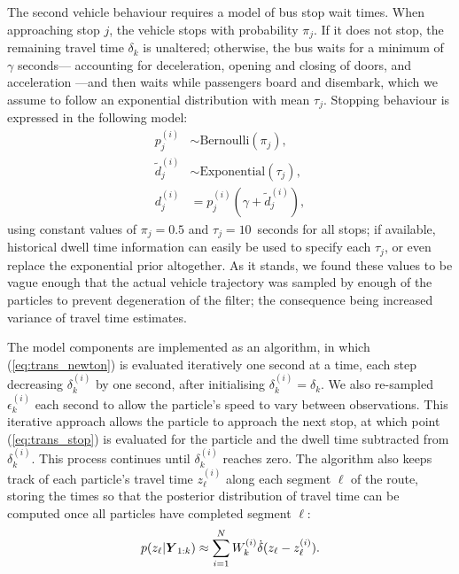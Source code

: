 \documentclass[times, doublespace]{anzsauth}
\begin{document}
The second vehicle behaviour requires a model of bus stop wait times.
When approaching stop $j$,
the vehicle stops with probability $\pi_j$.
If it does not stop, the remaining travel time $\delta_k$ is unaltered;
otherwise, the bus waits for a minimum of $\gamma$ seconds---%
accounting for deceleration, opening and closing of doors, and acceleration
\citep{Hans_2015}---and then waits while passengers board and disembark,
which we assume to follow an exponential distribution with mean $\tau_j$.
Stopping behaviour is expressed in the following model:
\begin{equation}
\label{eq:trans_stop}
\begin{split}
p_j^{(i)} &\sim \mathrm{Bernoulli}(\pi_j), \\
\tilde d_j^{(i)} &\sim \mathrm{Exponential}(\tau_j), \\
d_j^{(i)} &= p_j^{(i)}(\gamma + \tilde d_j^{(i)}),
\end{split}
\end{equation}
using constant values of $\pi_j = 0.5$ and $\tau_j = 10$~seconds for all stops;
if available, historical dwell time information can easily be used
to specify each $\tau_j$,
or even replace the exponential prior altogether.
As it stands, we found these values to be vague enough that
the actual vehicle trajectory was sampled by enough of the particles
to prevent degeneration of the filter;
the consequence being increased variance of travel time estimates.


The model components are implemented as an algorithm,
in which (\ref{eq:trans_newton}) is evaluated iteratively one second at a time,
each step decreasing $\delta_k^{(i)}$ by one second,
after initialising $\delta_k^{(i)} = \delta_k$.
We also re-sampled
$\epsilon_k^{(i)}$ each second
to allow the particle's speed to vary between observations.
This iterative approach allows the particle to approach the next stop,
at which point (\ref{eq:trans_stop}) is evaluated for the particle
and the dwell time subtracted from $\delta_k^{(i)}$.
This process continues until $\delta_k^{(i)}$ reaches zero.
The algorithm also keeps track of each particle's travel time $z_\ell^{(i)}$
along each segment $\ell$ of the route,
storing the times so that the posterior distribution of travel time
can be computed once all particles have completed segment $\ell$:
\begin{equation}
\label{eq:post_tt}
p(z_\ell | \mbox{$\boldsymbol{Y}$}_{1:k}) \approx
    \sum_{i=1}^N W_k^{(i)} \dot\delta(z_\ell - z_\ell^{(i)}).
\end{equation}
\end{document}
